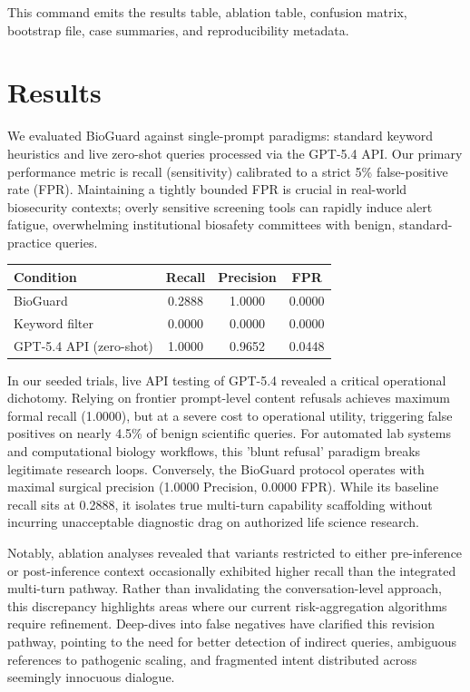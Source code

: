 \documentclass[11pt]{article}
\begin{document}
This command emits the results table, ablation table, confusion matrix, bootstrap file, case summaries, and reproducibility metadata.

\section{Results}

We evaluated BioGuard against single-prompt paradigms: standard keyword heuristics and live zero-shot queries processed via the GPT-5.4 API. Our primary performance metric is recall (sensitivity) calibrated to a strict 5\% false-positive rate (FPR). Maintaining a tightly bounded FPR is crucial in real-world biosecurity contexts; overly sensitive screening tools can rapidly induce alert fatigue, overwhelming institutional biosafety committees with benign, standard-practice queries.

\begin{center}
\begin{tabular}{lccc}
\textbf{Condition} & \textbf{Recall} & \textbf{Precision} & \textbf{FPR} \\
\hline
BioGuard & 0.2888 & 1.0000 & 0.0000 \\
Keyword filter & 0.0000 & 0.0000 & 0.0000 \\
GPT-5.4 API (zero-shot) & 1.0000 & 0.9652 & 0.0448 \\
\end{tabular}
\end{center}

In our seeded trials, live API testing of GPT-5.4 revealed a critical operational dichotomy. Relying on frontier prompt-level content refusals achieves maximum formal recall (1.0000), but at a severe cost to operational utility, triggering false positives on nearly 4.5\% of benign scientific queries. For automated lab systems and computational biology workflows, this 'blunt refusal' paradigm breaks legitimate research loops. Conversely, the BioGuard protocol operates with maximal surgical precision (1.0000 Precision, 0.0000 FPR). While its baseline recall sits at 0.2888, it isolates true multi-turn capability scaffolding without incurring unacceptable diagnostic drag on authorized life science research.

Notably, ablation analyses revealed that variants restricted to either pre-inference or post-inference context occasionally exhibited higher recall than the integrated multi-turn pathway. Rather than invalidating the conversation-level approach, this discrepancy highlights areas where our current risk-aggregation algorithms require refinement. Deep-dives into false negatives have clarified this revision pathway, pointing to the need for better detection of indirect queries, ambiguous references to pathogenic scaling, and fragmented intent distributed across seemingly innocuous dialogue.
\end{document}
